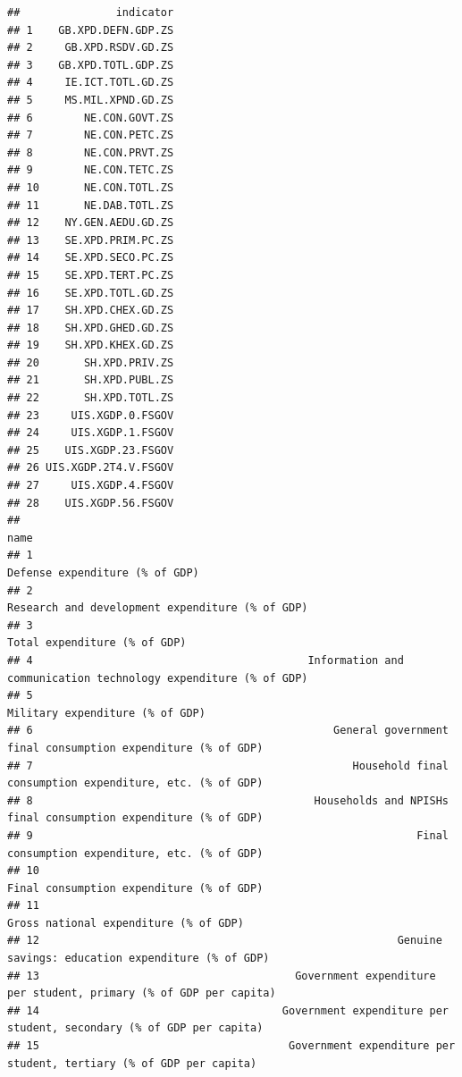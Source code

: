 \documentclass[
]{article}
\begin{document}
\begin{verbatim}
##               indicator
## 1    GB.XPD.DEFN.GDP.ZS
## 2     GB.XPD.RSDV.GD.ZS
## 3    GB.XPD.TOTL.GDP.ZS
## 4     IE.ICT.TOTL.GD.ZS
## 5     MS.MIL.XPND.GD.ZS
## 6        NE.CON.GOVT.ZS
## 7        NE.CON.PETC.ZS
## 8        NE.CON.PRVT.ZS
## 9        NE.CON.TETC.ZS
## 10       NE.CON.TOTL.ZS
## 11       NE.DAB.TOTL.ZS
## 12    NY.GEN.AEDU.GD.ZS
## 13    SE.XPD.PRIM.PC.ZS
## 14    SE.XPD.SECO.PC.ZS
## 15    SE.XPD.TERT.PC.ZS
## 16    SE.XPD.TOTL.GD.ZS
## 17    SH.XPD.CHEX.GD.ZS
## 18    SH.XPD.GHED.GD.ZS
## 19    SH.XPD.KHEX.GD.ZS
## 20       SH.XPD.PRIV.ZS
## 21       SH.XPD.PUBL.ZS
## 22       SH.XPD.TOTL.ZS
## 23     UIS.XGDP.0.FSGOV
## 24     UIS.XGDP.1.FSGOV
## 25    UIS.XGDP.23.FSGOV
## 26 UIS.XGDP.2T4.V.FSGOV
## 27     UIS.XGDP.4.FSGOV
## 28    UIS.XGDP.56.FSGOV
##                                                                                                        name
## 1                                                                            Defense expenditure (% of GDP)
## 2                                                           Research and development expenditure (% of GDP)
## 3                                                                              Total expenditure (% of GDP)
## 4                                           Information and communication technology expenditure (% of GDP)
## 5                                                                           Military expenditure (% of GDP)
## 6                                               General government final consumption expenditure (% of GDP)
## 7                                                  Household final consumption expenditure, etc. (% of GDP)
## 8                                            Households and NPISHs final consumption expenditure (% of GDP)
## 9                                                            Final consumption expenditure, etc. (% of GDP)
## 10                                                                 Final consumption expenditure (% of GDP)
## 11                                                                    Gross national expenditure (% of GDP)
## 12                                                        Genuine savings: education expenditure (% of GDP)
## 13                                        Government expenditure per student, primary (% of GDP per capita)
## 14                                      Government expenditure per student, secondary (% of GDP per capita)
## 15                                       Government expenditure per student, tertiary (% of GDP per capita)

\end{verbatim}
\end{document}
